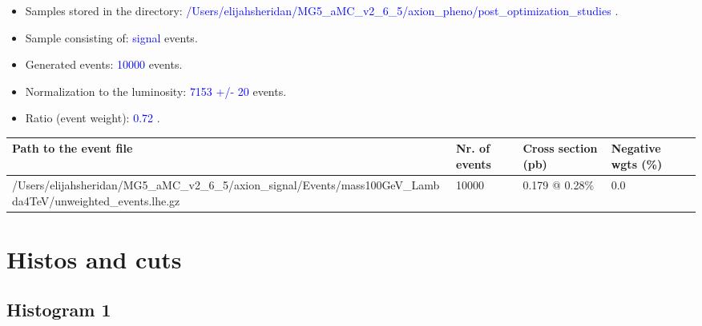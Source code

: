 \documentclass[a4paper, 10pt]{article}
\begin{document}
\begin{itemize}
  \item Samples stored in the directory: \textcolor{blue}{/\-Users/\-elijahsheridan/\-MG5\_aMC\_v2\_6\_5/\-axion\_pheno/\-post\_optimization\_studies} .
   \item Sample consisting of: \textcolor{blue}{signal}  events.
   \item Generated events: \textcolor{blue}{10000 }  events.
   \item Normalization to the luminosity: \textcolor{blue}{7153}\textcolor{blue}{ +/\-- }\textcolor{blue}{20 }  events.
   \item Ratio (event weight): \textcolor{blue}{0.72 } .  
 
\end{itemize}
\begin{table}[H]
  \begin{center}
    \begin{tabular}{|m{55.0mm}|m{25.0mm}|m{30.0mm}|m{30.0mm}|}
      \hline
      {\cellcolor{yellow}         Path to the event file}& {\cellcolor{yellow}         Nr. of events}& {\cellcolor{yellow}         Cross section (pb)}& {\cellcolor{yellow}         Negative wgts (\%)}\\
      \hline
      {\cellcolor{white}          /\-Users/\-elijahsheridan/\-MG5\_aMC\_v2\_6\_5/\-axion\_signal/\-Events/\-mass100GeV\_Lambda4TeV/\-unweighted\_events.lhe.gz}& {\cellcolor{white}          10000}& {\cellcolor{white}          0.179 @ 0.28\%}& {\cellcolor{white}          0.0}\\
\hline
    \end{tabular}
  \end{center}
\end{table}

\newpage
\section{ Histos and cuts}

\subsection{ Histogram 1}
\end{document}
